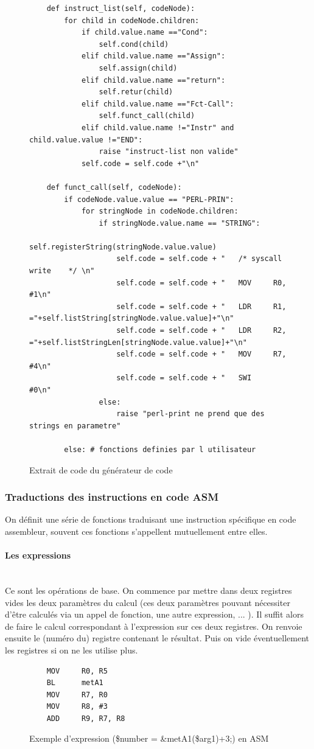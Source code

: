 \documentclass[a4paper,10pt]{article}
\begin{document}
	\begin{figure}[H]
\begin{lstlisting}
	def instruct_list(self, codeNode):
		for child in codeNode.children:
			if child.value.name =="Cond":
				self.cond(child)
			elif child.value.name =="Assign":
				self.assign(child)
			elif child.value.name =="return":
				self.retur(child)
			elif child.value.name =="Fct-Call":
				self.funct_call(child)
			elif child.value.name !="Instr" and child.value.value !="END":
				raise "instruct-list non valide"
			self.code = self.code +"\n"
				
	def funct_call(self, codeNode):
		if codeNode.value.value == "PERL-PRIN":
			for stringNode in codeNode.children:
				if stringNode.value.name == "STRING":
					self.registerString(stringNode.value.value)
					self.code = self.code + "	/* syscall write	*/ \n"
					self.code = self.code + "	MOV 	R0, #1\n"
					self.code = self.code + "	LDR 	R1, ="+self.listString[stringNode.value.value]+"\n"
					self.code = self.code + "	LDR 	R2, ="+self.listStringLen[stringNode.value.value]+"\n"
					self.code = self.code + "	MOV 	R7, #4\n"
					self.code = self.code + "	SWI 	#0\n"
				else:
					raise "perl-print ne prend que des strings en parametre"
			
		else: # fonctions definies par l utilisateur
\end{lstlisting}
\fontfamily{}
\caption{Extrait de code du générateur de code}
\label{lst:codeGeneration}
\end{figure}


	\subsubsection{Traductions des instructions en code ASM}
		On définit une série de fonctions traduisant une instruction spécifique en code assembleur, souvent ces fonctions s'appellent mutuellement entre elles.\\
		\paragraph{Les expressions}~\\
			Ce sont les opérations de base. On commence par mettre dans deux registres vides les deux paramètres du calcul (ces deux paramètres pouvant nécessiter d'être calculés via un appel de fonction, une autre expression, ... ). Il suffit alors de faire le calcul correspondant à l'expression sur ces deux registres. On renvoie ensuite le (numéro du) registre contenant le résultat. Puis on vide éventuellement les registres si on ne les utilise plus.
				\begin{figure}[H]
\begin{lstlisting}
	MOV 	R0, R5 		
	BL		metA1		
	MOV 	R7, R0		
	MOV 	R8, #3		
	ADD		R9, R7, R8	
\end{lstlisting}
\fontfamily{}
\caption{Exemple d'expression (\$number = \&metA1(\$arg1)+3;) en ASM}
\label{lst:ExExpression}
\end{figure}
\end{document}
